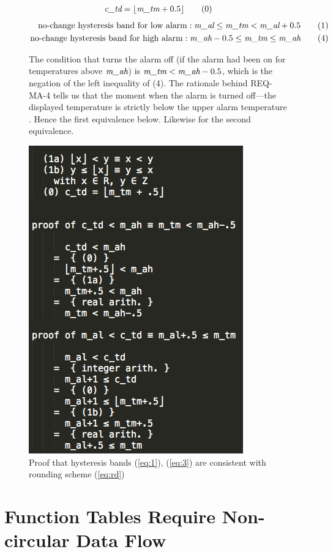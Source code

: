 \begin{figure}[htbp]

\begin{mdframed}\small
\begin{align}
\textit{c\_td} = \lfloor \textit{m\_tm} + 0.5\rfloor \tag{0}
\end{align}
\begin{align}
\textrm{no-change hysteresis band for low alarm}: 
\textit{m\_al} \leq \textit{m\_tm} < \textit{m\_al}+ 0.5 \tag{1}\\
\textrm{no-change hysteresis band for high alarm}: 
\textit{m\_ah} -0.5 \leq \textit{m\_tm} \leq \textit{m\_ah} \tag{4}
\end{align}

The condition that turns the alarm off (if the alarm had been on for temperatures above $\textit{m\_ah}$) is $\textit{m\_tm} < \textit{m\_ah} -0.5$, which is 
the negation of the left inequality of (4). The rationale behind REQ-MA-4 tells us that the moment when the alarm is turned off---the displayed temperature is strictly below the upper alarm temperature  . Hence the first equivalence below. Likewise for the second equivalence.
\bigskip
\begin{center}
\includegraphics[width=.5\textwidth]{pics/hysteresis-proof.png}
\end{center}
\end{mdframed}
\caption{Proof that hysteresis bands (\ref{eq:1}), (\ref{eq:3}) are consistent with rounding scheme (\ref{eq:rd}) }
\label{fig:proof}
\end{figure}

\section{Function Tables Require Non-circular Data Flow}

